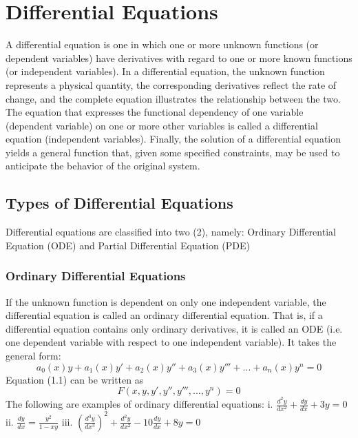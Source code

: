 \documentclass[12pt]{report}
\begin{document}
\section{Differential Equations}
\noindent A differential equation is one in which one or more unknown functions (or dependent variables) have derivatives with regard to one or more known functions (or independent variables). In a differential equation, the unknown function represents a physical quantity, the corresponding derivatives reflect the rate of change, and the complete equation illustrates the relationship between the two. The equation that expresses the functional dependency of one variable (dependent variable) on one or more other variables is called a differential equation (independent variables). Finally, the solution of a differential equation yields a general function that, given some specified constraints, may be used to anticipate the behavior of the original system.
\subsection{Types of Differential Equations}
Differential equations are classified into two (2), namely: Ordinary Differential Equation (ODE) and Partial Differential Equation (PDE)

\subsubsection{Ordinary Differential Equations}
		
If the unknown function is dependent on only one independent variable, the differential equation is called an ordinary differential equation. That is, if a differential equation contains only ordinary derivatives, it is called an ODE (i.e. one dependent variable with respect to one independent variable). It takes the general form:
\begin{equation}
a_{0} (x)y+ a_{1} (x) y'+ a_{2} (x) y''+ a_{3} (x) y'''+...+ a_{n} (x) y^{n}=0
\end{equation}
Equation (1.1) can be written as 
\begin{equation}
F(x,y,y',y'',y''',...,y^{n})=0
\end{equation}
The following are examples of ordinary differential equations: 
i. $	\frac{d^{2} y}{dx^{2} }+  \frac{dy}{dx}+3y=0$ 
ii. $\frac{dy}{dx} = \frac{y^{2}}{1-xy} $  
iii. $(\frac{d^{3} y}{dx^{3} })^{2} + \frac{d^{2} y}{dx^{2} } - 10\frac{dy}{dx} +8y = 0 $
 
\end{document}

